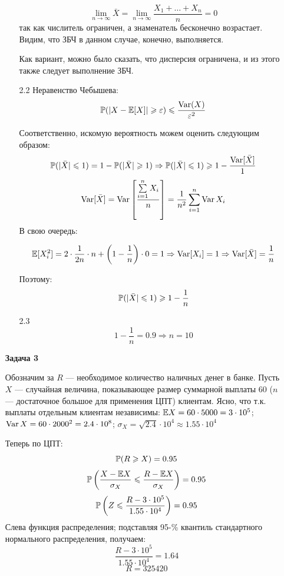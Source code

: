 \documentclass[12pt, a4paper]{article}\usepackage[]{graphicx}\usepackage[]{color}
\begin{document}
\begin{enumerate}
\begin{enumerate}
						$$
						\lim\limits_{n\rightarrow\infty} \bar{X} = \lim\limits_{n\rightarrow\infty} \frac{X_1 +\dots + X_n}{n} = 0
						$$
						так как числитель ограничен, а знаменатель бесконечно возрастает.
						Видим, что ЗБЧ в данном случае, конечно, выполняется.

						Как вариант, можно было сказать, что дисперсия ограничена, и из этого также следует выполнение ЗБЧ.
						\item[2.2] Неравенство Чебышева:
						$$
						\P(|X-\E[X]|\geqslant \varepsilon) \leqslant \frac{\Var(X)}{\varepsilon^2}
						$$

						Соответственно, искомую вероятность можем оценить следующим образом:
						$$
						\P(|\bar{X}| \leqslant 1) = 1 -\P(|\bar{X}| \geqslant 1) \Rightarrow \P(|\bar{X}| \leqslant 1) \geqslant 1 - \frac{\Var[\bar{X}]}{1}
						$$
						$$
						\Var[\bar{X}] = \Var\left[\frac{\sum\limits_{i=1}^{n} X_i}{n}\right] = \frac{1}{n^2}\sum \limits_{i=1}^{n} \Var{X_i}
						$$
						В свою очередь:

						$$
						\E[X_i^2] = 2\cdot\frac{1}{2n}\cdot n + \left(1-\frac{1}{n}\right)\cdot0 = 1 \Rightarrow \Var[X_i] = 1 \Rightarrow \Var[\bar{X}] = \frac{1}{n}
						$$

						Поэтому:
						$$
						\P(|\bar{X}| \leqslant 1)\geqslant 1 - \frac{1}{n}
						$$

						\item[2.3 ]  $$1 - \frac{1}{n} = 0.9  \Rightarrow n = 10$$

					\end{enumerate}

					\item[\textbf{Задача 3}]

					Обозначим за $R$ — необходимое количество наличных денег в банке. Пусть $X$ — случайная величина, показывающее размер суммарной выплаты $60$ ($n$ — достаточное большое для применения ЦПТ) клиентам. Ясно, что т.к. выплаты отдельным клиентам независимы: \( \E X = 60 \cdot 5000 = 3\cdot 10^5 \); \( \Var X = 60 \cdot 2000^2 = 2.4 \cdot 10^8 \); \( \sigma_X = \sqrt{2.4} \cdot 10^4 \approx 1.55 \cdot 10^4\)

					Теперь по ЦПТ:
					\[\P(R \geqslant X) = 0.95 \]
					\[\P \left(\dfrac{X - \E X}{\sigma_X} \leqslant \dfrac{R - \E X}{\sigma_X} \right) = 0.95 \]
					\[ \P \left( Z \leqslant \dfrac{R - 3 \cdot 10^5}{1.55 \cdot 10^4} \right) = 0.95 \]
					Слева функция распределения; подставляя 95-\% квантиль стандартного нормального распределения, получаем:
					\[ \dfrac{R - 3 \cdot 10^5}{1.55 \cdot 10^4} = 1.64 \]
					\[ R = 325420 \]



\end{enumerate}
\end{document}
